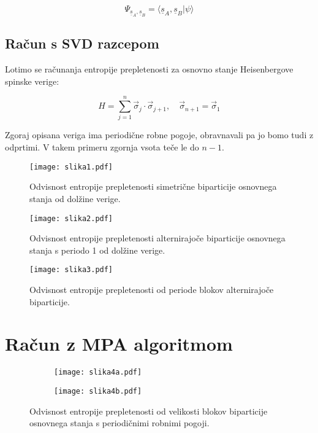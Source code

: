 \documentclass[a4paper]{article}
\newcommand{\ket}[1]{|#1\rangle}
\newcommand{\s}{\sigma}
\newcommand{\vs}{\vec{\s}}
\newcommand{\us}{\underline{s}}
\begin{document}
    \begin{equation}\label{eq18}
        \Psi_{\us_A, \us_B} = \langle \us_A, \us_B \ket{\psi}
    \end{equation}

    \subsection{Račun s SVD razcepom} 

    Lotimo se računanja entropije prepletenosti za osnovno stanje Heisenbergove spinske verige:
 
    \begin{equation}\label{eq19}
        H = \sum_{j=1}^{n} \vs_j \cdot \vs_{j+1}, \quad \vs_{n+1} = \vs_1
    \end{equation}

    Zgoraj opisana veriga ima periodične robne pogoje, obravnavali pa jo bomo tudi z odprtimi. V takem primeru zgornja vsota teče le do $n - 1$.

    \begin{figure}
        \centering
        \texttt{[image: slika1.pdf]}
        \caption{Odvisnost entropije prepletenosti simetrične biparticije osnovnega stanja od dolžine verige.}
        \label{slika1}
    \end{figure}

    \begin{figure}
        \centering
        \texttt{[image: slika2.pdf]}
        \caption{Odvisnost entropije prepletenosti alternirajoče biparticije osnovnega stanja s periodo 1 od dolžine verige.}
        \label{slika2}
    \end{figure}

    \begin{figure}
        \centering
        \texttt{[image: slika3.pdf]}
        \caption{Odvisnost entropije prepletenosti od periode blokov alternirajoče biparticije.}
        \label{slika3}
    \end{figure}

    \section{Račun z MPA algoritmom}

    \begin{figure}
        \centering
        \begin{subfigure}{\textwidth}
            \texttt{[image: slika4a.pdf]}
        \end{subfigure}
        \begin{subfigure}{\textwidth}
            \texttt{[image: slika4b.pdf]}
        \end{subfigure}
        \caption{Odvisnost entropije prepletenosti od velikosti blokov biparticije osnovnega stanja s periodičnimi robnimi pogoji.}
        \label{slika4}
    \end{figure}
\end{document}
